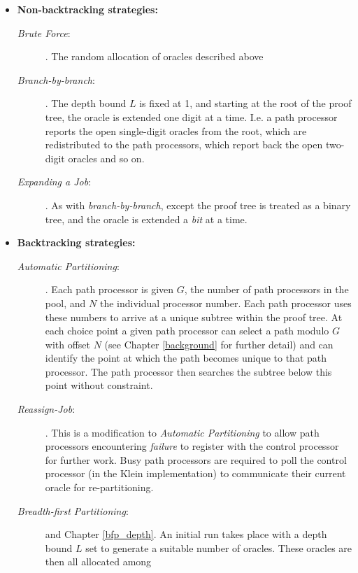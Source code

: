 \begin{itemize}
\item{\textbf{Non-backtracking strategies:}
  \begin{description}
    \item[\textit{Brute Force}:]{ \cite{CA87}.
       The random allocation of oracles described above}
    \item[\textit{Branch-by-branch}:]{ \cite{Kle91}. 
      The depth bound $L$ is fixed at 1, and
      starting at the root of the proof tree, the oracle is extended one digit at
      a time.  I.e. a path processor reports the open single-digit oracles from
      the root, which are redistributed to the path processors, which report back the
      open two-digit oracles and so on.}
    \item[\textit{Expanding a Job}:]{ \cite{CA87}.
      As with \textit{branch-by-branch}, except
      the proof tree is treated as a binary tree, and the oracle is extended a
      \textit{bit} at a time.}
  \end{description}}
\item{\textbf{Backtracking strategies:}
  \begin{description}
    \item[\textit{Automatic Partitioning}:]{ \cite{Kle91}.
      Each path processor is given $G$, the number of path processors in the pool,
      and $N$ the individual processor number.  Each path processor uses these numbers to
      arrive at a unique subtree within the proof tree.  At each choice point a
      given path processor can select a path modulo $G$ with offset $N$ (see 
      Chapter \ref{background} for further detail) and can identify the point at which
      the path becomes unique to that path processor.  The path processor then
      searches the subtree below this point without constraint.}
    \item[\textit{Reassign-Job}:]{ \cite{Kle91}.
      This is a modification to \textit{Automatic Partitioning} to allow path
      processors encountering \textit{failure} to register with the control
      processor for further work.  Busy path processors are required to poll
      the control processor (in the Klein implementation) to communicate their
      current oracle for re-partitioning.}
    \item[\textit{Breadth-first Partitioning}:]{ \cite{Sar95} and Chapter \ref{bfp_depth}.
      An initial run takes place with a depth bound $L$ set to generate a
      suitable number of oracles.  These oracles are then all allocated among
}
\end{description}}
\end{itemize}
